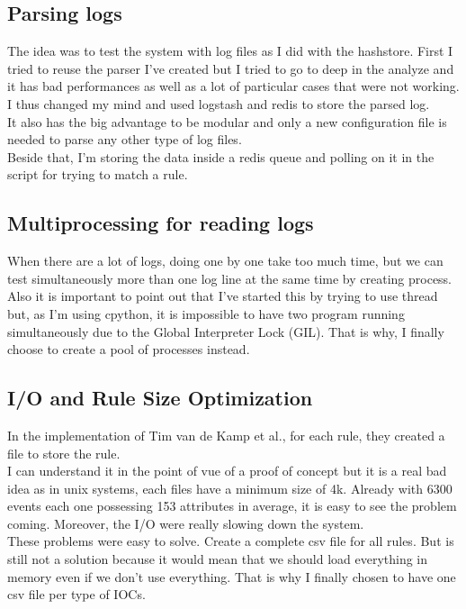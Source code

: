 \documentclass{eplmastersthesis}
\begin{document}
\subsection{Parsing logs}
The idea was to test the system with log files as I did with the hashstore. First I tried to reuse the parser I've created but I tried to go to deep in the analyze and it has bad performances as well as a lot of particular cases that were not working.\\
I thus changed my mind and used logstash and redis to store the parsed log. \\
It also has the big advantage to be modular and only a new configuration file is needed to parse any other type of log files.\\
Beside that, I'm storing the data inside a redis queue and polling on it in the script for trying to match a rule. \\

\subsection{Multiprocessing for reading logs}
When there are a lot of logs, doing one by one take too much time, but we can test simultaneously more than one log line at the same time by creating process.\\
Also it is important to point out that I've started this by trying to use thread but, as I'm using cpython, it is impossible to have two program running simultaneously due to the Global Interpreter Lock (GIL). That is why, I finally choose to create a pool of processes instead.


\subsection{I/O and Rule Size Optimization}
In the implementation of Tim van de Kamp et al., for each rule, they created a file to store the rule. \\
I can understand it in the point of vue of a proof of concept but it is a real bad idea as in unix systems, each files have a minimum size of 4k. Already with 6300 events each one possessing 153 attributes in average, it is easy to see the problem coming. Moreover, the I/O were really slowing down the system. \\
These problems were easy to solve. Create a complete csv file for all rules. But is still not a solution because it would mean that we should load everything in memory even if we don't use everything. That is why I finally chosen to have one csv file per type of IOCs.
\end{document}
